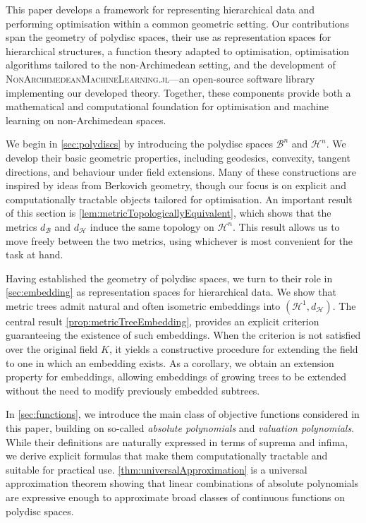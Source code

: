 \documentclass[10pt]{article}
\theoremstyle{definition}
\begin{document}
This paper develops a framework for representing hierarchical data and performing optimisation within a common geometric setting. Our contributions span the geometry of polydisc spaces, their use as representation spaces for hierarchical structures, a function theory adapted to optimisation, optimisation algorithms tailored to the non-Archimedean setting, and the development of \textsc{NonArchimedeanMachineLearning.jl}---an open-source software library implementing our developed theory. Together, these components provide both a mathematical and computational foundation for optimisation and machine learning on non-Archimedean spaces.

We begin in \cref{sec:polydiscs} by introducing the polydisc spaces $\mathcal B^n$ and $\mathcal H^n$. 
We develop their basic geometric properties, including geodesics, convexity, tangent directions, and behaviour under field extensions. Many of these constructions are inspired by ideas from Berkovich geometry, though our focus is on explicit and computationally tractable objects tailored for optimisation. An important result of this section is \cref{lem:metricTopologicallyEquivalent}, which shows that the metrics $d_{\mathcal B}$ and $d_{\mathcal H}$ induce the same topology on $\mathcal H^n$. This result allows us to move freely between the two metrics, using whichever is most convenient for the task at hand.

Having established the geometry of polydisc spaces, we turn to their role in \cref{sec:embedding} as representation spaces for hierarchical data. We show that metric trees admit natural and often isometric embeddings into $(\mathcal H^1,d_{\mathcal H})$. The central result \cref{prop:metricTreeEmbedding}, provides an explicit criterion guaranteeing the existence of such embeddings. When the criterion is not satisfied over the original field $K$, it yields a constructive procedure for extending the field to one in which an embedding exists. As a corollary, we obtain an extension property for embeddings, allowing embeddings of growing trees to be extended without the need to modify previously embedded subtrees.

In \cref{sec:functions}, we introduce the main class of objective functions considered in this paper, building on so-called \emph{absolute polynomials} and \emph{valuation polynomials}. While their definitions are naturally expressed in terms of suprema and infima, we derive explicit formulas that make them computationally tractable and suitable for practical use. \cref{thm:universalApproximation} is a universal approximation theorem showing that linear combinations of absolute polynomials are expressive enough to approximate broad classes of continuous functions on polydisc spaces.
\end{document}
